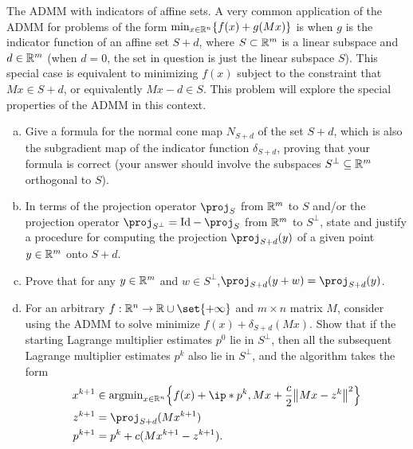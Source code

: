 \documentclass{article}
\begin{document}
\begin{problem}
    {The ADMM with indicators of affine sets.}
    A very common application of the ADMM for problems of the form $\min_{x\in\mathbb{R}^n}\lbrace f(x)+g(Mx)\rbrace$ is when $g$ is the indicator function of an affine set $S+d$, where $S\subset\mathbb{R}^m$ is a linear subspace and $d\in\mathbb{R}^m$ (when $d=0$, the set in question is just the linear subspace $S$). This special case is equivalent to minimizing $f(x)$ subject to the constraint that $Mx\in S+d$, or equivalently $Mx-d\in S$. This problem will explore the special properties of the ADMM in this context.
    \begin{enumerate}[(a)]
        \item Give a formula for the normal cone map $N_{S+d}$ of the set $S+d$, which is also the subgradient map of the indicator function $\delta_{S+d}$, proving that your formula is correct (your answer should involve the subspaces $S^{\bot}\subseteq\mathbb{R}^m$ orthogonal to $S$).
        \item In terms of the projection operator $\proj_S$ from $\mathbb{R}^m$ to $S$ and/or the projection operator $\proj_{S^{\bot}}=\mathrm{Id}-\proj_S$ from $\mathbb{R}^m$ to $S^{\bot}$, state and justify a procedure for computing the projection $\proj_{S+d}(y)$ of a given point $y\in\mathbb{R}^m$ onto $S+d$.
        \item Prove that for any $y\in\mathbb{R}^m$ and $w\in S^{\bot}$,$\proj_{S+d}(y+w)=\proj_{S+d}(y)$.
        \item For an arbitrary $f:\R^n\rightarrow\R\cup\set{+\infty}$ and $m\times n$ matrix $M$, consider using the ADMM to solve minimize $f(x)+\delta_{S+d}(Mx)$. Show that if the starting Lagrange multiplier estimates $p^0$ lie in $S^{\bot}$, then all the subsequent Lagrange multiplier estimates $p^k$ also lie in $S^{\bot}$, and the algorithm takes the form
        \begin{align*}
            x^{k+1} &\in \argmin_{x\in\R^n}\braces*{f(x)+\ip*{p^k,Mx}+\frac{c}{2}\norm*{Mx-z^k}^2} \\
            z^{k+1} &= \proj_{S+d}(Mx^{k+1}) \\
            p^{k+1} &= p^k+c(Mx^{k+1}-z^{k+1}).
        \end{align*}
    \end{enumerate}
\end{problem}
\end{document}
